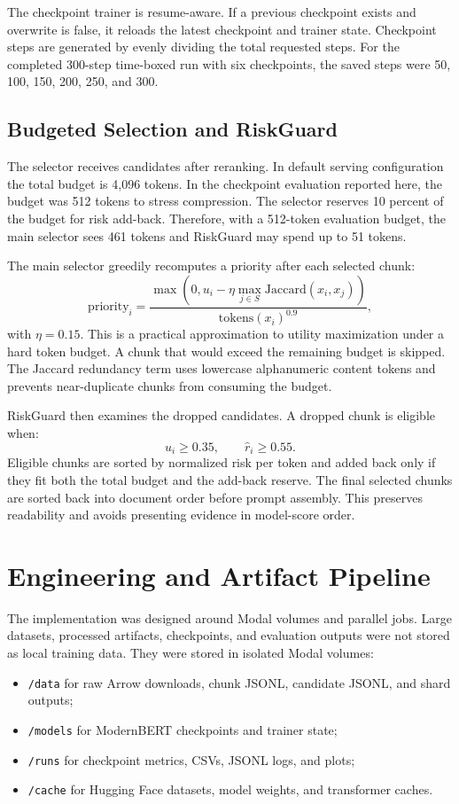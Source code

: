 \documentclass[10pt,twocolumn]{article}
\begin{document}
The checkpoint trainer is resume-aware. If a previous checkpoint exists and overwrite is false, it reloads the latest checkpoint and trainer state. Checkpoint steps are generated by evenly dividing the total requested steps. For the completed 300-step time-boxed run with six checkpoints, the saved steps were 50, 100, 150, 200, 250, and 300.

\subsection{Budgeted Selection and RiskGuard}
The selector receives candidates after reranking. In default serving configuration the total budget is 4,096 tokens. In the checkpoint evaluation reported here, the budget was 512 tokens to stress compression. The selector reserves 10 percent of the budget for risk add-back. Therefore, with a 512-token evaluation budget, the main selector sees 461 tokens and RiskGuard may spend up to 51 tokens.

The main selector greedily recomputes a priority after each selected chunk:
\[
\mathrm{priority}_i=
\frac{\max(0,u_i-\eta\max_{j\in S}\mathrm{Jaccard}(x_i,x_j))}
{\mathrm{tokens}(x_i)^{0.9}},
\]
with $\eta=0.15$. This is a practical approximation to utility maximization under a hard token budget. A chunk that would exceed the remaining budget is skipped. The Jaccard redundancy term uses lowercase alphanumeric content tokens and prevents near-duplicate chunks from consuming the budget.

RiskGuard then examines the dropped candidates. A dropped chunk is eligible when:
\[
u_i \geq 0.35,\qquad \hat{r}_i \geq 0.55.
\]
Eligible chunks are sorted by normalized risk per token and added back only if they fit both the total budget and the add-back reserve. The final selected chunks are sorted back into document order before prompt assembly. This preserves readability and avoids presenting evidence in model-score order.

\section{Engineering and Artifact Pipeline}
The implementation was designed around Modal volumes and parallel jobs. Large datasets, processed artifacts, checkpoints, and evaluation outputs were not stored as local training data. They were stored in isolated Modal volumes:
\begin{itemize}
\item \texttt{/data} for raw Arrow downloads, chunk JSONL, candidate JSONL, and shard outputs;
\item \texttt{/models} for ModernBERT checkpoints and trainer state;
\item \texttt{/runs} for checkpoint metrics, CSVs, JSONL logs, and plots;
\item \texttt{/cache} for Hugging Face datasets, model weights, and transformer caches.
\end{itemize}
\end{document}
